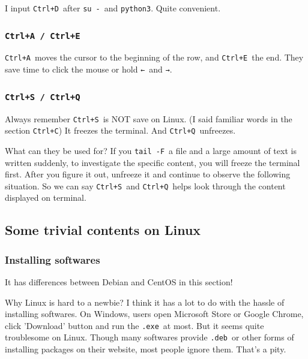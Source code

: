 \documentclass[12pt]{ctexart}
\newenvironment{mdquote}
{%
  \par\noindent
  \begin{list}{}{%
      \setlength{\leftmargin}{1em}%
      \setlength{\rightmargin}{0pt}%
      \setlength{\itemindent}{0pt}%
      \setlength{\listparindent}{\parindent}%
      \setlength{\topsep}{0.5\baselineskip}%
  }
  \item[\textbf{>}\ ]\itshape
}
{\end{list}\par}
\begin{document}
I input \texttt{Ctrl+D}\ after \texttt{su\ -}\ and \texttt{python3}. Quite
convenient.

\subsubsection*{\textbf{\texttt{Ctrl+A / Ctrl+E}}}

\texttt{Ctrl+A}\ moves the cursor to the beginning of the row, and
\texttt{Ctrl+E}\ the end. They save time to click the mouse or hold
\texttt{←}\ and \texttt{→}.

\subsubsection*{\textbf{\texttt{Ctrl+S / Ctrl+Q}}}

Always remember \texttt{Ctrl+S}\ is NOT save on Linux. (I said familiar
words in the section \texttt{Ctrl+C}) It freezes the terminal. And
\texttt{Ctrl+Q}\ unfreezes.

What can they be used for? If you \texttt{tail\ -F}\ a file and a large
amount of text is written suddenly, to investigate the specific content,
you will freeze the terminal first. After you figure it out, unfreeze it
and continue to observe the following situation. So we can say
\texttt{Ctrl+S}\ and \texttt{Ctrl+Q}\ helps look through the content
displayed on terminal.

\newpage
\subsection{\textbf{Some trivial contents on Linux}}

\subsubsection{\textbf{Installing softwares}}

\begin{mdquote}
It has differences between Debian and CentOS in this section!
\end{mdquote}

Why Linux is hard to a newbie? I think it has a lot to do with the
hassle of installing softwares. On Windows, users open Microsoft Store
or Google Chrome, click 'Download' button and run the \texttt{.exe}\ at
most. But it seems quite troublesome on Linux. Though many softwares
provide \texttt{.deb}\ or other forms of installing packages on their
website, most people ignore them. That's a pity.
\end{document}

